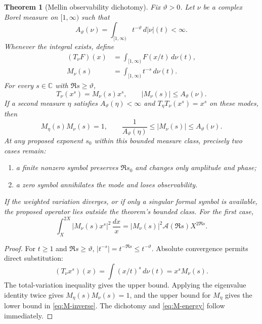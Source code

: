 \documentclass[11pt,a4paper]{amsart}
\newtheorem{theorem}{Theorem}[section]
\theoremstyle{definition}
\newcommand{\C}{\mathbb C}
\newcommand{\cA}{\mathcal A}
\begin{document}
\begin{theorem}[Mellin observability dichotomy]\label{thm:Mellin}
Fix $\vartheta>0$.  Let $\nu$ be a complex Borel measure on $[1,\infty)$ such that
\begin{equation}\label{eq:A-theta}
 A_\vartheta(\nu)=\int_{[1,\infty)}t^{-\vartheta}\,d|\nu|(t)<\infty.
\end{equation}
Whenever the integral exists, define
\begin{align}
 (T_\nu F)(x)&=\int_{[1,\infty)}F(x/t)\,d\nu(t),\label{eq:T-nu}\\
 M_\nu(s)&=\int_{[1,\infty)}t^{-s}\,d\nu(t).
 \label{eq:M-nu}
\end{align}
For every $s\in\C$ with $\Re s\ge\vartheta$,
\begin{equation}\label{eq:M-eigen}
 T_\nu(x^s)=M_\nu(s)x^s,
 \qquad |M_\nu(s)|\le A_\vartheta(\nu).
\end{equation}
If a second measure $\eta$ satisfies $A_\vartheta(\eta)<\infty$ and
$T_\eta T_\nu(x^s)=x^s$ on these modes, then
\begin{equation}\label{eq:M-inverse}
 M_\eta(s)M_\nu(s)=1,
 \qquad
 \frac1{A_\vartheta(\eta)}
 \le |M_\nu(s)|\le A_\vartheta(\nu).
\end{equation}
At any proposed exponent $s_0$ within this bounded measure class, precisely two cases remain:
\begin{enumerate}[label=\textup{(\roman*)},leftmargin=2.3em]
 \item a finite nonzero symbol preserves $\Re s_0$ and changes only amplitude and phase;
 \item a zero symbol annihilates the mode and loses observability.
\end{enumerate}
If the weighted variation diverges, or if only a singular formal symbol is
available, the proposed operator lies outside the theorem's bounded class.
For the first case,
\begin{equation}\label{eq:M-energy}
 \int_X^{2X}|M_\nu(s)x^s|^2\,\frac{dx}{x}
 =|M_\nu(s)|^2\cA(\Re s)X^{2\Re s}.
\end{equation}
\end{theorem}

\begin{proof}
For $t\ge1$ and $\Re s\ge\vartheta$,
$|t^{-s}|=t^{-\Re s}\le t^{-\vartheta}$.  Absolute convergence permits direct substitution:
\[
 (T_\nu x^s)(x)
 =\int(x/t)^s\,d\nu(t)
 =x^sM_\nu(s).
\]
The total-variation inequality gives the upper bound.  Applying the eigenvalue identity twice gives
$M_\eta(s)M_\nu(s)=1$, and the upper bound for $M_\eta$ gives the lower bound in \eqref{eq:M-inverse}.  The dichotomy and \eqref{eq:M-energy} follow immediately.
\end{proof}
\end{document}
